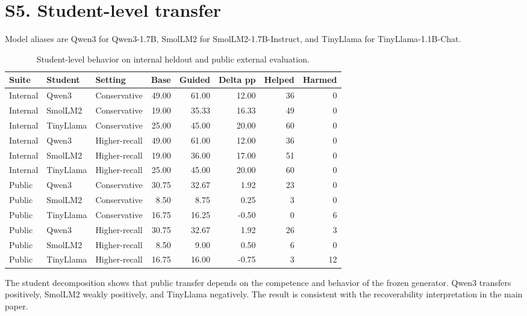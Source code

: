 \documentclass[11pt]{article}
\begin{document}
\section*{S5. Student-level transfer}
Model aliases are Qwen3 for Qwen3-1.7B, SmolLM2 for SmolLM2-1.7B-Instruct, and TinyLlama for TinyLlama-1.1B-Chat.
\begin{table}[H]
\centering
\small
\caption{Student-level behavior on internal heldout and public external evaluation.}
\begin{tabular}{lllrrrrr}
\toprule
Suite & Student & Setting & Base & Guided & Delta pp & Helped & Harmed \\
\midrule
Internal & Qwen3 & Conservative & 49.00 & 61.00 & 12.00 & 36 & 0 \\
Internal & SmolLM2 & Conservative & 19.00 & 35.33 & 16.33 & 49 & 0 \\
Internal & TinyLlama & Conservative & 25.00 & 45.00 & 20.00 & 60 & 0 \\
Internal & Qwen3 & Higher-recall & 49.00 & 61.00 & 12.00 & 36 & 0 \\
Internal & SmolLM2 & Higher-recall & 19.00 & 36.00 & 17.00 & 51 & 0 \\
Internal & TinyLlama & Higher-recall & 25.00 & 45.00 & 20.00 & 60 & 0 \\
Public & Qwen3 & Conservative & 30.75 & 32.67 & 1.92 & 23 & 0 \\
Public & SmolLM2 & Conservative & 8.50 & 8.75 & 0.25 & 3 & 0 \\
Public & TinyLlama & Conservative & 16.75 & 16.25 & -0.50 & 0 & 6 \\
Public & Qwen3 & Higher-recall & 30.75 & 32.67 & 1.92 & 26 & 3 \\
Public & SmolLM2 & Higher-recall & 8.50 & 9.00 & 0.50 & 6 & 0 \\
Public & TinyLlama & Higher-recall & 16.75 & 16.00 & -0.75 & 3 & 12 \\
\bottomrule
\end{tabular}
\end{table}

The student decomposition shows that public transfer depends on the competence and behavior of the frozen generator. Qwen3 transfers positively, SmolLM2 weakly positively, and TinyLlama negatively. The result is consistent with the recoverability interpretation in the main paper.
\end{document}
